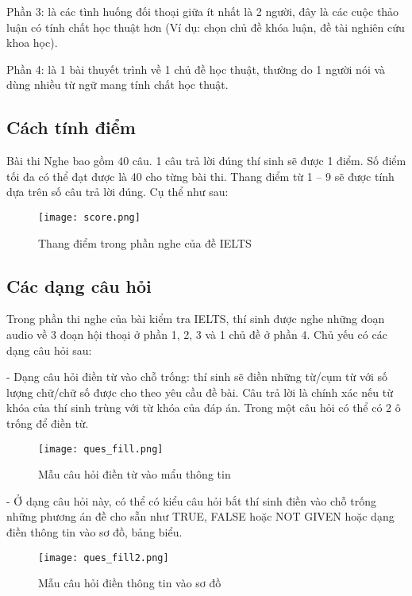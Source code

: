 \quad Phần 3: là các tình huống đối thoại giữa ít nhất là 2 người, đây là các cuộc thảo luận có tính chất học thuật hơn (Ví dụ: chọn chủ đề khóa luận, đề tài nghiên cứu khoa học).

\quad Phần 4: là 1 bài thuyết trình về 1 chủ đề học thuật, thường do 1 người nói và dùng nhiều từ ngữ mang tính chất học thuật.

\subsection{Cách tính điểm}

Bài thi Nghe bao gồm 40 câu. 1 câu trả lời đúng thí sinh sẽ được 1 điểm. Số điểm tối đa có thể đạt được là 40 cho từng bài thi. Thang điểm từ 1 – 9 sẽ được tính dựa trên số câu trả lời đúng. Cụ thể như sau:\\

\begin{figure}[htb] 
\centering
\texttt{[image: score.png]}
\caption{Thang điểm trong phần nghe của đề IELTS}
\end{figure}

\subsection{Các dạng câu hỏi}

Trong phần thi nghe của bài kiểm tra IELTS, thí sinh được nghe những đoạn audio về  3 đoạn hội thoại ở phần 1, 2, 3 và 1 chủ đề ở phần 4. Chủ yếu có các dạng câu hỏi sau:

\quad - Dạng câu hỏi điền từ vào chỗ trống: thí sinh sẽ điền những từ/cụm từ với số lượng chữ/chữ số được cho theo yêu cầu đề bài. Câu trả lời là chính xác nếu từ khóa của thí sinh trùng với từ khóa của đáp án. Trong một câu hỏi có thể có 2 ô trống để điền từ.

\begin{figure}[htb] 
\centering
\texttt{[image: ques\_fill.png]}
\caption{Mẫu câu hỏi điền từ vào mẩu thông tin}
\end{figure}

\quad - Ở dạng câu hỏi này, có thể có kiểu câu hỏi bắt thí sinh điền vào chỗ trống những phương án đề cho sẵn như TRUE, FALSE hoặc NOT GIVEN hoặc dạng điền thông tin vào sơ đồ, bảng biểu.

\begin{figure}[!htb] 
\centering
\texttt{[image: ques\_fill2.png]}
\caption{Mẫu câu hỏi điền thông tin vào sơ đồ}
\end{figure}

